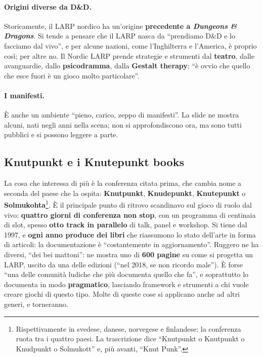\paragraph{Origini diverse da D\&D.} Storicamente, il LARP nordico ha
un'origine \textbf{precedente a \emph{Dungeons \& Dragons}}. Si tende a pensare
che il LARP nasca da ``prendiamo D\&D e lo facciamo dal vivo'', e per alcune
nazioni, come l'Inghilterra e l'America, è proprio così; per altre no. Il Nordic
LARP prende strategie e strumenti dal \textbf{teatro}, dalle avanguardie, dallo
\textbf{psicodramma}, dalla \textbf{Gestalt therapy}; ``è ovvio che quello che
esce fuori è un gioco molto particolare''.

\paragraph{I manifesti.} È anche un ambiente ``pieno, carico, zeppo di
manifesti''. La slide ne mostra alcuni, nati negli anni nella scena; non si
approfondiscono ora, ma sono tutti pubblici e si possono leggere a parte.

\subsection{Knutpunkt e i Knutepunkt books}

La cosa che interessa di più è la conferenza citata prima, che cambia nome a
seconda del paese che la ospita: \textbf{Knutpunkt}, \textbf{Knudepunkt},
\textbf{Knutepunkt} o \textbf{Solmukohta}\footnote{Rispettivamente in svedese,
danese, norvegese e finlandese: la conferenza ruota tra i quattro paesi. La
trascrizione dice ``Knutpunkt o Knutpunkt o Knudpunkt o Solmukott'' e, più
avanti, ``Knut Punk''.}. È il principale punto di ritrovo scandinavo sul gioco
di ruolo dal vivo: \textbf{quattro giorni di conferenza non stop}, con un
programma di centinaia di slot, spesso \textbf{otto track in parallelo} di talk,
panel e workshop. Si tiene dal 1997, e \textbf{ogni anno produce dei libri}
che riassumono lo stato dell'arte in forma di articoli: la documentazione è
``costantemente in aggiornamento''. Ruggero ne ha diversi, ``dei bei mattoni'':
ne mostra uno di \textbf{600 pagine} su come si progetta un LARP, uscito da una
delle edizioni (``nel 2018, se non ricordo male''). È forse ``una delle
comunità ludiche che più documenta quello che fa'', e soprattutto lo documenta
in modo \textbf{pragmatico}, lasciando framework e strumenti a chi vuole creare
giochi di questo tipo. Molte di queste cose si applicano anche ad altri generi, e
torneranno.

